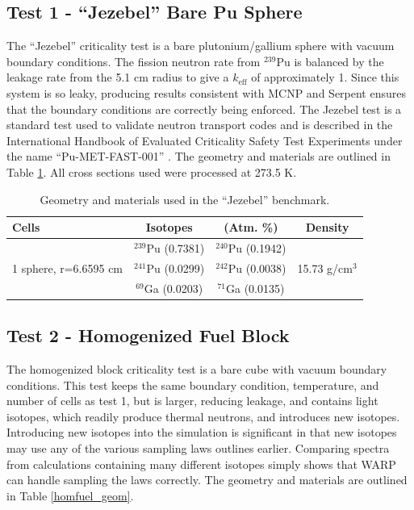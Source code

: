 \documentclass[preprint,12pt]{elsarticle}
\begin{document}
\subsection{Test 1 - ``Jezebel'' Bare Pu Sphere}

The ``Jezebel'' criticality test is a bare plutonium/gallium sphere with vacuum boundary conditions.   The fission neutron rate from $^{239}$Pu is balanced by the leakage rate from the 5.1 cm radius to give a $k_\mathrm{eff}$ of approximately 1.  Since this system is so leaky, producing results consistent with MCNP and Serpent ensures that the boundary conditions are correctly being enforced.  The Jezebel test is a standard test used to validate neutron transport codes and is described in the International Handbook of Evaluated Criticality Safety Test Experiments under the name ``Pu-MET-FAST-001'' \cite{bench_handbook}.  The geometry and materials are outlined in Table \ref{jezebel_geom}.  All cross sections used were processed at 273.5 K.

\begin{table}[h]
\centering
\caption{Geometry and materials used in the ``Jezebel'' benchmark.}
\label{jezebel_geom}
\begin{tabular}{| l | c  c | c |}
\hline
Cells & Isotopes & (Atm. \%)& Density \\
\hline
\multirow{3}{*}{1 sphere, r=6.6595 cm }  &  $^{239}$Pu (0.7381)    &    $^{240}$Pu (0.1942)     &  \multirow{3}{*}{15.73 g/cm$^3$} \\
                                         &  $^{241}$Pu (0.0299)    &     $^{242}$Pu (0.0038)    &   \\
                                         &  $^{69}$Ga  (0.0203)    &     $^{71}$Ga  (0.0135)    &   \\
\hline
\end{tabular}
\end{table}

\subsection{Test 2 - Homogenized Fuel Block}

The homogenized block criticality test is a bare cube with vacuum boundary conditions.  This test keeps the same boundary condition, temperature, and number of cells as test 1, but is larger, reducing leakage, and contains light isotopes, which readily produce thermal neutrons, and introduces new isotopes.  Introducing new isotopes into the simulation is significant in that new isotopes may use any of the various sampling laws outlines earlier.  Comparing spectra from calculations containing many different isotopes simply shows that WARP can handle sampling the laws correctly.  The geometry and materials are outlined in Table \ref{homfuel_geom}.  
\end{document}
